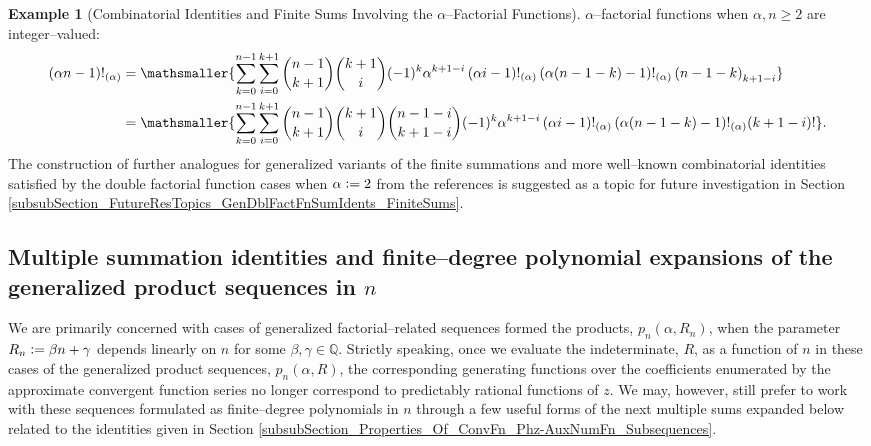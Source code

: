 \documentclass[12pt,reqno]{article}
\numberwithin{sfootnote}{section}
\numberwithin{equation}{section}
\theoremstyle{plain}
\theoremstyle{definition}
\newtheorem{example}[theorem]{Example}
\theoremstyle{remark}
\newcommand{\defequals}{\ensuremath{\vcentcolon=}}
\newcommand{\Pochhammer}[2]{\ensuremath{\left(#1\right)_{#2}}}
\newcommand{\AlphaFactorial}[2]{\ensuremath{\left(#1\right)!_{\left(#2\right)}}}
\begin{document}
\begin{example}[Combinatorial Identities and Finite Sums Involving the $\alpha$--Factorial Functions]
$\alpha$--factorial functions when $\alpha, n \geq 2$ are integer--valued: 
\begin{align*} 
(\alpha n - 1)!_{(\alpha)} & = 
     \mathsmaller{
     \sum\limits_{k=0}^{n-1} \sum\limits_{i=0}^{k+1} 
     \binom{n-1}{k+1} \binom{k+1}{i} 
     (-1)^{k} \alpha^{k+1-i} 
     \AlphaFactorial{\alpha i-1}{\alpha} 
     \AlphaFactorial{\alpha (n-1-k)-1}{\alpha} 
     \Pochhammer{n-1-k}{k+1-i} 
     } \\ 
     & = 
     \mathsmaller{
     \sum\limits_{k=0}^{n-1} \sum\limits_{i=0}^{k+1} 
     \binom{n-1}{k+1} \binom{k+1}{i} \binom{n-1-i}{k+1-i} 
     (-1)^{k} \alpha^{k+1-i} 
     \AlphaFactorial{\alpha i-1}{\alpha} 
     \AlphaFactorial{\alpha (n-1-k)-1}{\alpha} 
     (k+1-i)! 
     }. 
\end{align*} 
The construction of further 
analogues for generalized variants of the finite summations and 
more well--known combinatorial identities satisfied by the 
double factorial function cases when $\alpha \defequals 2$ from the 
references is suggested as a topic for future investigation in 
Section \ref{subsubSection_FutureResTopics_GenDblFactFnSumIdents_FiniteSums}. 
\end{example} 

\subsection{Multiple summation identities and finite--degree polynomial 
            expansions of the generalized product sequences in $n$} 

We are primarily concerned with cases of generalized factorial--related 
sequences formed the products, $p_n(\alpha, R_n)$, when the 
parameter $R_n \defequals \beta n+\gamma$ depends linearly on $n$ for some 
$\beta, \gamma \in \mathbb{Q}$. 
Strictly speaking, once we evaluate the indeterminate, $R$, as a 
function of $n$ in these cases of the generalized product sequences, 
$p_n(\alpha, R)$, the corresponding generating functions over the 
coefficients enumerated by the approximate convergent function series 
no longer correspond to predictably rational functions of $z$. 
We may, however, still prefer to work with these sequences formulated as 
finite--degree polynomials in $n$ through a few useful forms of the 
next multiple sums expanded below related to the identities given in 
Section \ref{subsubSection_Properties_Of_ConvFn_Phz-AuxNumFn_Subsequences}. 
\end{document}
